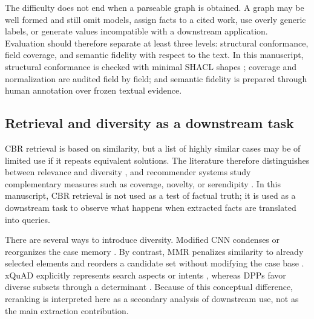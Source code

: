 \documentclass[journal]{IEEEtran}
\begin{document}
The difficulty does not end when a parseable graph is obtained. A graph may be well formed and still omit models, assign facts to a cited work, use overly generic labels, or generate values incompatible with a downstream application. Evaluation should therefore separate at least three levels: structural conformance, field coverage, and semantic fidelity with respect to the text. In this manuscript, structural conformance is checked with minimal SHACL shapes \cite{SHACL2017}; coverage and normalization are audited field by field; and semantic fidelity is prepared through human annotation over frozen textual evidence.

\subsection{Retrieval and diversity as a downstream task}

CBR retrieval is based on similarity, but a list of highly similar cases may be of limited use if it repeats equivalent solutions. The literature therefore distinguishes between relevance and diversity \cite{SmythMcClave2001Diversity,McSherry2002Diversity}, and recommender systems study complementary measures such as coverage, novelty, or serendipity \cite{KaminskasBridge2016BeyondAccuracy}. In this manuscript, CBR retrieval is not used as a test of factual truth; it is used as a downstream task to observe what happens when extracted facts are translated into queries.

There are several ways to introduce diversity. Modified CNN condenses or reorganizes the case memory \cite{MunozPena2025Diversity}. By contrast, MMR penalizes similarity to already selected elements and reorders a candidate set without modifying the case base \cite{CarbonellGoldstein1998MMR}. xQuAD explicitly represents search aspects or intents \cite{Santos2010xQuAD}, whereas DPPs favor diverse subsets through a determinant \cite{Gan2020DPP}. Because of this conceptual difference, reranking is interpreted here as a secondary analysis of downstream use, not as the main extraction contribution.
\end{document}
